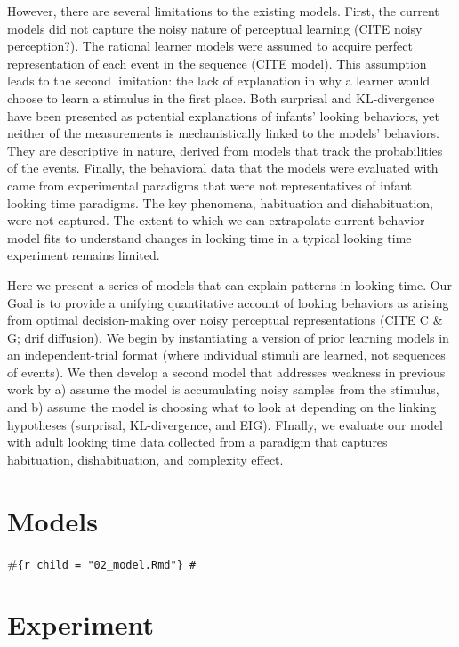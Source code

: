 \documentclass[10pt, letterpaper]{article}
\begin{document}
However, there are several limitations to the existing models. First,
the current models did not capture the noisy nature of perceptual
learning (CITE noisy perception?). The rational learner models were
assumed to acquire perfect representation of each event in the sequence
(CITE model). This assumption leads to the second limitation: the lack
of explanation in why a learner would choose to learn a stimulus in the
first place. Both surprisal and KL-divergence have been presented as
potential explanations of infants' looking behaviors, yet neither of the
measurements is mechanistically linked to the models' behaviors. They
are descriptive in nature, derived from models that track the
probabilities of the events. Finally, the behavioral data that the
models were evaluated with came from experimental paradigms that were
not representatives of infant looking time paradigms. The key phenomena,
habituation and dishabituation, were not captured. The extent to which
we can extrapolate current behavior-model fits to understand changes in
looking time in a typical looking time experiment remains limited.

Here we present a series of models that can explain patterns in looking
time. Our Goal is to provide a unifying quantitative account of looking
behaviors as arising from optimal decision-making over noisy perceptual
representations (CITE C \& G; drif diffusion). We begin by instantiating
a version of prior learning models in an independent-trial format (where
individual stimuli are learned, not sequences of events). We then
develop a second model that addresses weakness in previous work by a)
assume the model is accumulating noisy samples from the stimulus, and b)
assume the model is choosing what to look at depending on the linking
hypotheses (surprisal, KL-divergence, and EIG). FInally, we evaluate our
model with adult looking time data collected from a paradigm that
captures habituation, dishabituation, and complexity effect.

\hypertarget{models}{%
\section{Models}\label{models}}

\#\texttt{\{r\ child\ =\ "02\_model.Rmd"\}\ \#}

\hypertarget{experiment}{%
\section{Experiment}\label{experiment}}
\end{document}

